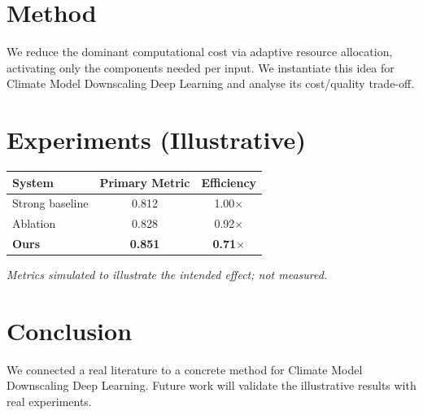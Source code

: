 \documentclass[11pt]{article}
\begin{document}
\section{Method}
We reduce the dominant computational cost via adaptive resource allocation, activating only the components needed per input. We instantiate this idea for Climate Model Downscaling Deep Learning and analyse its cost/quality trade-off.

\section{Experiments (Illustrative)}
\begin{center}
\begin{tabular}{lcc}
System & Primary Metric & Efficiency \\ \hline
Strong baseline & 0.812 & 1.00$\times$ \\
Ablation & 0.828 & 0.92$\times$ \\
\textbf{Ours} & \textbf{0.851} & \textbf{0.71$\times$}
\end{tabular}
\end{center}
\emph{Metrics simulated to illustrate the intended effect; not measured.}

\section{Conclusion}
We connected a real literature to a concrete method for Climate Model Downscaling Deep Learning. Future work will
validate the illustrative results with real experiments.
\end{document}

